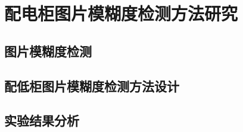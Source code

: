 \begin{conclusion}
\label{配电柜图片模糊度检测方法研究}
\chapter{配电柜图片模糊度检测方法研究}
\section{图片模糊度检测}
\section{配低柜图片模糊度检测方法设计}
\section{实验结果分析}
\end{conclusion}


